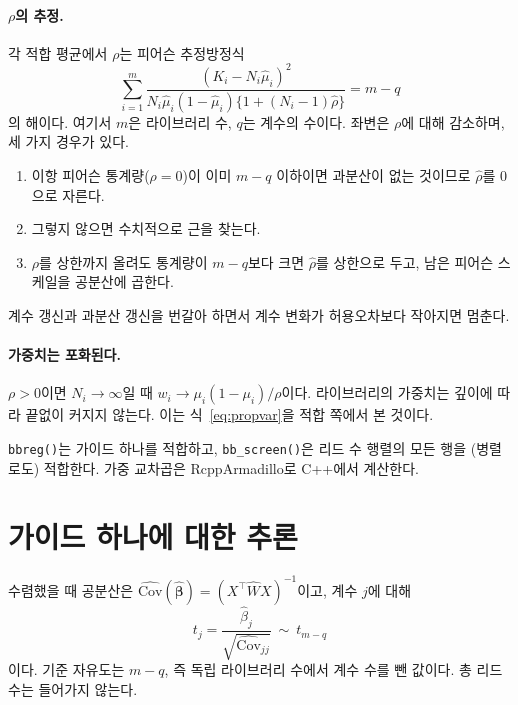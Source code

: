 \documentclass[11pt]{article}
\begin{document}
\paragraph{$\rho$의 추정.}
각 적합 평균에서 $\rho$는 피어슨 추정방정식
\begin{equation}
\sum_{i=1}^{m}\frac{(K_i-N_i\hat\mu_i)^2}
{N_i\hat\mu_i(1-\hat\mu_i)\{1+(N_i-1)\hat\rho\}}=m-q
\label{eq:pearson}
\end{equation}
의 해이다. 여기서 $m$은 라이브러리 수, $q$는 계수의 수이다. 좌변은 $\rho$에
대해 감소하며, 세 가지 경우가 있다.
\begin{enumerate}[itemsep=1pt]
\item 이항 피어슨 통계량($\rho=0$)이 이미 $m-q$ 이하이면 과분산이 없는
것이므로 $\hat\rho$를 0으로 자른다.
\item 그렇지 않으면 수치적으로 근을 찾는다.
\item $\rho$를 상한까지 올려도 통계량이 $m-q$보다 크면 $\hat\rho$를 상한으로
두고, 남은 피어슨 스케일을 공분산에 곱한다.
\end{enumerate}
계수 갱신과 과분산 갱신을 번갈아 하면서 계수 변화가 허용오차보다 작아지면
멈춘다.

\paragraph{가중치는 포화된다.}
$\rho>0$이면 $N_i\to\infty$일 때 $w_i\to\mu_i(1-\mu_i)/\rho$이다. 라이브러리의
가중치는 깊이에 따라 끝없이 커지지 않는다. 이는 식~\eqref{eq:propvar}을 적합
쪽에서 본 것이다.

\begin{incode}
\texttt{bbreg()}는 가이드 하나를 적합하고, \texttt{bb\_screen()}은 리드 수
행렬의 모든 행을 (병렬로도) 적합한다. 가중 교차곱은 RcppArmadillo로 C++에서
계산한다.
\end{incode}

\section{가이드 하나에 대한 추론}

수렴했을 때 공분산은 $\widehat{\mathrm{Cov}}(\widehat{\boldsymbol\beta})
=(X^\top\widehat WX)^{-1}$이고, 계수 $j$에 대해
\begin{equation}
t_j=\frac{\hat\beta_j}{\sqrt{\widehat{\mathrm{Cov}}_{jj}}}\ \sim\ t_{m-q}
\end{equation}
이다. 기준 자유도는 $m-q$, 즉 독립 라이브러리 수에서 계수 수를 뺀 값이다.
총 리드 수는 들어가지 않는다.
\end{document}
